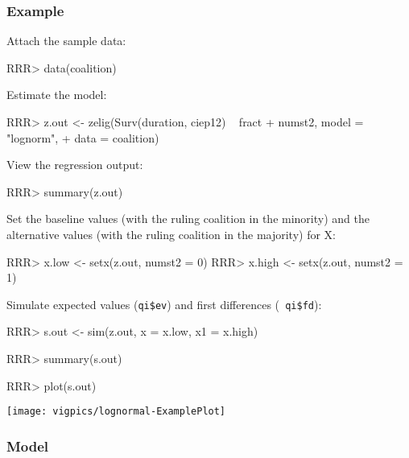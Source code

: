 \subsubsection{Example}

Attach the sample data: 
\begin{Schunk}
\begin{Sinput}
RRR>  data(coalition)
\end{Sinput}
\end{Schunk}
Estimate the model: 
\begin{Schunk}
\begin{Sinput}
RRR>  z.out <- zelig(Surv(duration, ciep12) ~ fract + numst2, model = "lognorm",
+                  data = coalition)
\end{Sinput}
\end{Schunk}
View the regression output:  
\begin{Schunk}
\begin{Sinput}
RRR>  summary(z.out)
\end{Sinput}
\end{Schunk}
Set the baseline values (with the ruling coalition in the minority)
and the alternative values (with the ruling coalition in the majority)
for X:
\begin{Schunk}
\begin{Sinput}
RRR>  x.low <- setx(z.out, numst2 = 0)
RRR>  x.high <- setx(z.out, numst2 = 1)
\end{Sinput}
\end{Schunk}
Simulate expected values ({\tt qi\$ev}) and first differences ({\tt
  qi\$fd}):
\begin{Schunk}
\begin{Sinput}
RRR>  s.out <- sim(z.out, x = x.low, x1 = x.high)
\end{Sinput}
\end{Schunk}
\begin{Schunk}
\begin{Sinput}
RRR>  summary(s.out)
\end{Sinput}
\end{Schunk}
\begin{center}
\begin{Schunk}
\begin{Sinput}
RRR>  plot(s.out)
\end{Sinput}
\end{Schunk}
\texttt{[image: vigpics/lognormal-ExamplePlot]}
\end{center} 

\subsubsection{Model}

